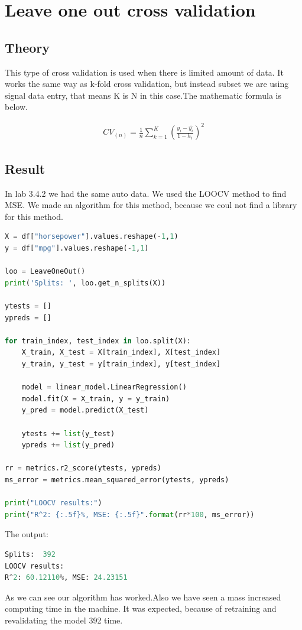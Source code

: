 \section {Leave one out cross validation}

\subsection{Theory}
This type of cross validation is used when there is limited amount of data. It works the same way as k-fold cross validation, but instead subset we are using signal data entry, that means K is N in this case.The mathematic formula is below. 

\begin{align}\label{fo:LOOCV}
CV_{(n)} = \frac {1}{n} \sum_{k=1}^{K}  (\frac {y_i-\hat{y_i}}{1- h_i})^2
\end{align}
\subsection{Result}
In lab 3.4.2 we had the same auto data. We used the LOOCV method to find MSE. We made an algorithm for this method, because we coul not find a library for this method.

\begin{lstlisting}[language=Python]
X = df["horsepower"].values.reshape(-1,1)
y = df["mpg"].values.reshape(-1,1) 

loo = LeaveOneOut()
print('Splits: ', loo.get_n_splits(X))

ytests = []
ypreds = []

for train_index, test_index in loo.split(X):
	X_train, X_test = X[train_index], X[test_index]
	y_train, y_test = y[train_index], y[test_index]

	model = linear_model.LinearRegression()
	model.fit(X = X_train, y = y_train)
	y_pred = model.predict(X_test)

	ytests += list(y_test)
	ypreds += list(y_pred)
	
rr = metrics.r2_score(ytests, ypreds)
ms_error = metrics.mean_squared_error(ytests, ypreds)

print("LOOCV results:")
print("R^2: {:.5f}%, MSE: {:.5f}".format(rr*100, ms_error))
\end{lstlisting}

The output:
\begin{lstlisting}[language=Python]
Splits:  392
LOOCV results:
R^2: 60.12110%, MSE: 24.23151
\end{lstlisting}

As we can see our algorithm has worked.Also we have seen a mass increased computing time in the machine. It was expected, because of retraining and revalidating the model 392 time.





